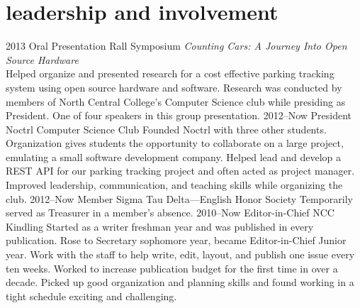 \documentclass[]{friggeri-cv} %
\begin{document}
\section{leadership and involvement}

\begin{entrylist}
\entry
{2013}
{Oral Presentation}
{Rall Symposium}
{\emph{Counting Cars: A Journey Into Open Source Hardware}\\
Helped organize and presented research for a cost effective parking tracking system using open source hardware and software.
Research was conducted by members of North Central College's Computer Science club while presiding as President.
One of four speakers in this group presentation.}
\entry
{2012--Now}
{President}
{Noctrl Computer Science Club}
{Founded Noctrl with three other students.
Organization gives students the opportunity to collaborate on a large project, emulating a small software development company.
Helped lead and develop a REST API for our parking tracking project and often acted as project manager.
Improved leadership, communication, and teaching skills while organizing the club.}
\entry
{2012--Now}
{Member}
{Sigma Tau Delta---English Honor Society}
{Temporarily served as Treasurer in a member's absence.}
\entry
{2010--Now}
{Editor-in-Chief}
{NCC Kindling}
{Started as a writer freshman year and was published in every publication.
Rose to Secretary sophomore year, became Editor-in-Chief Junior year.
Work with the staff to help write, edit, layout, and publish one issue every ten weeks.
Worked to increase publication budget for the first time in over a decade.
Picked up good organization and planning skills and found working in a tight schedule exciting and challenging.}
\end{entrylist}
\end{document}
